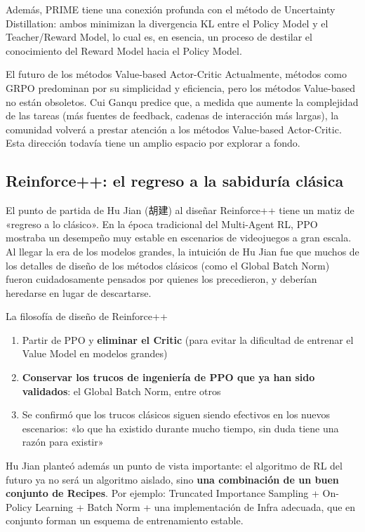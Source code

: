 \documentclass[a4paper]{article}
\begin{document}
Además, PRIME tiene una conexión profunda con el método de Uncertainty Distillation: ambos minimizan la divergencia KL entre el Policy Model y el Teacher/Reward Model, lo cual es, en esencia, un proceso de destilar el conocimiento del Reward Model hacia el Policy Model.

\begin{knowledgebox}{El futuro de los métodos Value-based Actor-Critic}
Actualmente, métodos como GRPO predominan por su simplicidad y eficiencia, pero los métodos Value-based no están obsoletos. Cui Ganqu predice que, a medida que aumente la complejidad de las tareas (más fuentes de feedback, cadenas de interacción más largas), la comunidad volverá a prestar atención a los métodos Value-based Actor-Critic. Esta dirección todavía tiene un amplio espacio por explorar a fondo.
\end{knowledgebox}

\subsection{Reinforce++: el regreso a la sabiduría clásica}

El punto de partida de Hu Jian (胡建) al diseñar Reinforce++ tiene un matiz de «regreso a lo clásico». En la época tradicional del Multi-Agent RL, PPO mostraba un desempeño muy estable en escenarios de videojuegos a gran escala. Al llegar la era de los modelos grandes, la intuición de Hu Jian fue que muchos de los detalles de diseño de los métodos clásicos (como el Global Batch Norm) fueron cuidadosamente pensados por quienes los precedieron, y deberían heredarse en lugar de descartarse.

\begin{importantbox}{La filosofía de diseño de Reinforce++}
\begin{enumerate}
    \item Partir de PPO y \textbf{eliminar el Critic} (para evitar la dificultad de entrenar el Value Model en modelos grandes)
    \item \textbf{Conservar los trucos de ingeniería de PPO que ya han sido validados}: el Global Batch Norm, entre otros
    \item Se confirmó que los trucos clásicos siguen siendo efectivos en los nuevos escenarios: «lo que ha existido durante mucho tiempo, sin duda tiene una razón para existir»
\end{enumerate}
\end{importantbox}

Hu Jian planteó además un punto de vista importante: el algoritmo de RL del futuro ya no será un algoritmo aislado, sino \textbf{una combinación de un buen conjunto de Recipes}. Por ejemplo: Truncated Importance Sampling + On-Policy Learning + Batch Norm + una implementación de Infra adecuada, que en conjunto forman un esquema de entrenamiento estable.
\end{document}

